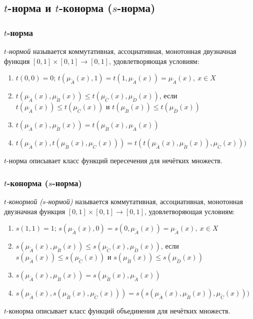 \documentclass{beamer}
\begin{document}
\subsection{$t$-норма и $t$-конорма ($s$-норма)}

\begin{frame}\frametitle{$t$-норма}
    
    \begin{definition}
        \textit{$t$-нормой} называется коммутативная, ассоциативная, монотонная двузначная функция $[0, 1] \times [0, 1] \to [0, 1]$, удовлетворяющая условиям:
        \begin{enumerate}
            \item $t(0,0) = 0$; $t(\mu_{\tilde{A}}(x), 1) = t(1, \mu_{\tilde{A}}(x)) = \mu_{\tilde{A}}(x),\ x \in X$
            \item $t(\mu_{\tilde{A}}(x), \mu_{\tilde{B}}(x)) \leq t(\mu_{\tilde{C}}(x), \mu_{\tilde{D}}(x))$, если $t(\mu_{\tilde{A}}(x)) \leq t(\mu_{\tilde{C}}(x))$ и $t(\mu_{\tilde{B}}(x)) \leq t(\mu_{\tilde{D}}(x))$
            \item $t(\mu_{\tilde{A}}(x), \mu_{\tilde{B}}(x)) = t(\mu_{\tilde{B}}(x), \mu_{\tilde{A}}(x))$
            \item $t(\mu_{\tilde{A}}(x), t(\mu_{\tilde{B}}(x), \mu_{\tilde{C}}(x))) = t(t(\mu_{\tilde{A}}(x), \mu_{\tilde{B}}(x)), \mu_{\tilde{C}}(x)))$
        \end{enumerate}
    \end{definition}
    
    $t$-норма описывает класс функций пересечения для нечётких множеств.
\end{frame}

\begin{frame}\frametitle{$t$-конорма ($s$-норма)}
    
    \begin{definition}
        \textit{$t$-конормой ($s$-нормой)} называется коммутативная, ассоциативная, монотонная двузначная функция $[0, 1] \times [0, 1] \to [0, 1]$, удовлетворяющая условиям:
        \begin{enumerate}
            \item $s(1,1) = 1$; $s(\mu_{\tilde{A}}(x), 0) = s(0, \mu_{\tilde{A}}(x)) = \mu_{\tilde{A}}(x),\ x \in X$
            \item $s(\mu_{\tilde{A}}(x), \mu_{\tilde{B}}(x)) \leq s(\mu_{\tilde{C}}(x), \mu_{\tilde{D}}(x))$, если $s(\mu_{\tilde{A}}(x)) \leq s(\mu_{\tilde{C}}(x))$ и $s(\mu_{\tilde{B}}(x)) \leq s(\mu_{\tilde{D}}(x))$
            \item $s(\mu_{\tilde{A}}(x), \mu_{\tilde{B}}(x)) = s(\mu_{\tilde{B}}(x), \mu_{\tilde{A}}(x))$
            \item $s(\mu_{\tilde{A}}(x), s(\mu_{\tilde{B}}(x), \mu_{\tilde{C}}(x))) = s(s(\mu_{\tilde{A}}(x), \mu_{\tilde{B}}(x)), \mu_{\tilde{C}}(x)))$
        \end{enumerate}
    \end{definition}
    
    $t$-конорма описывает класс функций объединения для нечётких множеств.
\end{frame}
\end{document}
